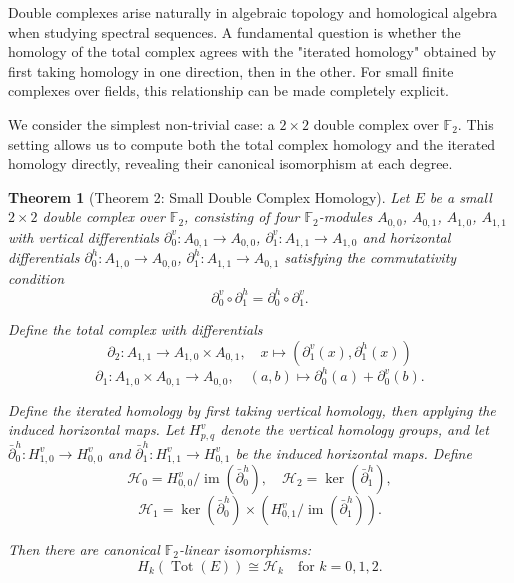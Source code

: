 \documentclass[11pt]{article}
\theoremstyle{plain}
\newtheorem*{theorem}{Theorem}
\theoremstyle{definition}
\theoremstyle{remark}
\renewcommand{\ker}{\operatorname{ker}}
\begin{document}
Double complexes arise naturally in algebraic topology and homological algebra when studying spectral sequences. A fundamental question is whether the homology of the total complex agrees with the "iterated homology" obtained by first taking homology in one direction, then in the other. For small finite complexes over fields, this relationship can be made completely explicit.

We consider the simplest non-trivial case: a $2 \times 2$ double complex over $\mathbb{F}_2$. This setting allows us to compute both the total complex homology and the iterated homology directly, revealing their canonical isomorphism at each degree.

\begin{theorem}[Theorem 2: Small Double Complex Homology]
Let $E$ be a small $2 \times 2$ double complex over $\mathbb{F}_2$, consisting of four $\mathbb{F}_2$-modules $A_{0,0}$, $A_{0,1}$, $A_{1,0}$, $A_{1,1}$ with vertical differentials $\partial^v_0 : A_{0,1} \to A_{0,0}$, $\partial^v_1 : A_{1,1} \to A_{1,0}$ and horizontal differentials $\partial^h_0 : A_{1,0} \to A_{0,0}$, $\partial^h_1 : A_{1,1} \to A_{0,1}$ satisfying the commutativity condition
\[
\partial^v_0 \circ \partial^h_1 = \partial^h_0 \circ \partial^v_1.
\]

Define the total complex with differentials
\[
\partial_2 : A_{1,1} \to A_{1,0} \times A_{0,1}, \quad x \mapsto (\partial^v_1(x), \partial^h_1(x))
\]
\[
\partial_1 : A_{1,0} \times A_{0,1} \to A_{0,0}, \quad (a,b) \mapsto \partial^h_0(a) + \partial^v_0(b).
\]

Define the iterated homology by first taking vertical homology, then applying the induced horizontal maps. Let $H^v_{p,q}$ denote the vertical homology groups, and let $\bar{\partial}^h_0 : H^v_{1,0} \to H^v_{0,0}$ and $\bar{\partial}^h_1 : H^v_{1,1} \to H^v_{0,1}$ be the induced horizontal maps. Define
\[
\mathcal{H}_0 = H^v_{0,0} / \operatorname{im}(\bar{\partial}^h_0), \quad \mathcal{H}_2 = \ker(\bar{\partial}^h_1),
\]
\[
\mathcal{H}_1 = \ker(\bar{\partial}^h_0) \times (H^v_{0,1} / \operatorname{im}(\bar{\partial}^h_1)).
\]

Then there are canonical $\mathbb{F}_2$-linear isomorphisms:
\[
H_k(\operatorname{Tot}(E)) \cong \mathcal{H}_k \quad \text{for } k = 0, 1, 2.
\]
\end{theorem}
\end{document}
